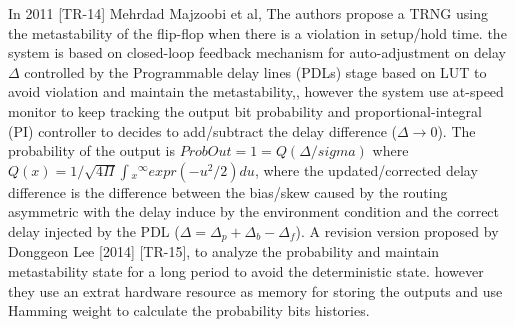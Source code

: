 In 2011 [TR-14] Mehrdad Majzoobi et al, The authors propose a TRNG using the metastability of the flip-flop when there is a violation in setup/hold time. the system is based on closed-loop feedback mechanism for auto-adjustment on delay $\Delta$ controlled by the Programmable delay lines (PDLs) stage based on LUT to avoid violation and maintain the metastability,, however the system use at-speed monitor to keep tracking the output bit probability and proportional-integral (PI) controller to decides to add/subtract the delay difference ($\Delta \rightarrow 0$). The probability of the output is $Prob{Out = 1} = Q(\Delta/sigma)$ where $Q(x)= {1/\surd{4\Pi}}{\int{_{x}{^{\infty}}} expr{(-u^{2}/2)du}}$, where the updated/corrected delay difference is the difference between the bias/skew caused by the routing asymmetric with the delay induce by the environment condition and the correct delay injected by the PDL ($\Delta=\Delta_{p}+\Delta_{b}-\Delta_{f}$). A revision version proposed by Donggeon Lee [2014] [TR-15], to analyze the probability and maintain metastability state for a long period to avoid the deterministic state. however they use an extrat hardware resource as memory for storing the outputs and use Hamming weight to calculate the probability bits histories.